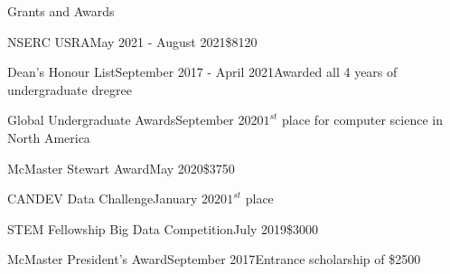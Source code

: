 \begin{rSection}{Grants and Awards} 

\begin{aSubsection}{NSERC USRA}{May 2021 - August 2021}{\$8120}{}
\end{aSubsection}

\begin{aSubsection}{Dean's Honour List}{September 2017 - April 2021}{Awarded all 4 years of undergraduate dregree}{}
\end{aSubsection}

\begin{aSubsection}{Global Undergraduate Awards}{September 2020}{$1^{st}$ place for computer science in North America}{}
\end{aSubsection}

\begin{aSubsection}{McMaster Stewart Award}{May 2020}{\$3750}{}
\end{aSubsection}

\begin{aSubsection}{CANDEV Data Challenge}{January 2020}{$1^{st}$ place}{}
\end{aSubsection}

\begin{aSubsection}{STEM Fellowship Big Data Competition}{July 2019}{\$3000}{}
\end{aSubsection}

\begin{aSubsection}{McMaster President's Award}{September 2017}{Entrance scholarship of \$2500}{}
\end{aSubsection}

\end{rSection}

